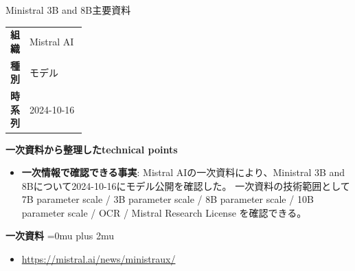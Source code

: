 \begin{technicalnote}{Ministral 3B and 8B}{主要資料}
\begingroup
\begin{tabularx}{\linewidth}{@{}>{\bfseries}p{0.22\linewidth}X@{}}
組織 & Mistral AI \\
種別 & モデル \\
時系列 & 2024-10-16 \\
\end{tabularx}
\smallskip
{\bfseries 一次資料から整理したtechnical points}
\begin{itemize}[leftmargin=1.5em,itemsep=0.35em]
\item \textbf{一次情報で確認できる事実}: Mistral AIの一次資料により、Ministral 3B and 8Bについて2024-10-16にモデル公開を確認した。 一次資料の技術範囲として 7B parameter scale / 3B parameter scale / 8B parameter scale / 10B parameter scale / OCR / Mistral Research License を確認できる。
\end{itemize}
\begin{minipage}{\linewidth}
\begin{samepage}
{\bfseries 一次資料}
\begingroup\sloppy
\Urlmuskip=0mu plus 2mu\relax
\begin{itemize}[leftmargin=1.5em,itemsep=0.25em]
\item {\scriptsize\url{https://mistral.ai/news/ministraux/}}
\end{itemize}
\endgroup
\end{samepage}
\end{minipage}
\endgroup
\end{technicalnote}
\medskip

